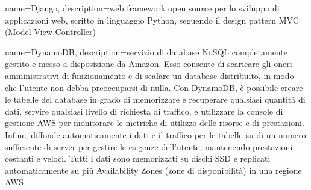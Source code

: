 {
	name=Django,
	description={web framework open source per lo sviluppo di applicazioni web, scritto in linguaggio Python, seguendo il design pattern MVC (Model-View-Controller)}
}

{
	name=DynamoDB,
	description={servizio di database NoSQL completamente gestito e messo a disposizione da Amazon. Esso consente di scaricare gli oneri amministrativi di funzionamento e di scalare un database distribuito, in modo che l'utente non debba preoccuparsi di nulla.
		Con DynamoDB, è possibile creare le tabelle del database in grado di memorizzare e recuperare qualsiasi quantità di dati, servire qualsiasi livello di richiesta di traffico, e utilizzare la console di gestione AWS per monitorare le metriche di utilizzo delle risorse e di prestazioni. Infine, diffonde automaticamente i dati e il traffico per le tabelle su di un numero sufficiente di server per gestire le esigenze dell'utente, mantenendo prestazioni costanti e veloci. Tutti i dati sono memorizzati su dischi SSD e replicati automaticamente su più Availability Zones (zone di disponibilità) in una regione AWS}
}
